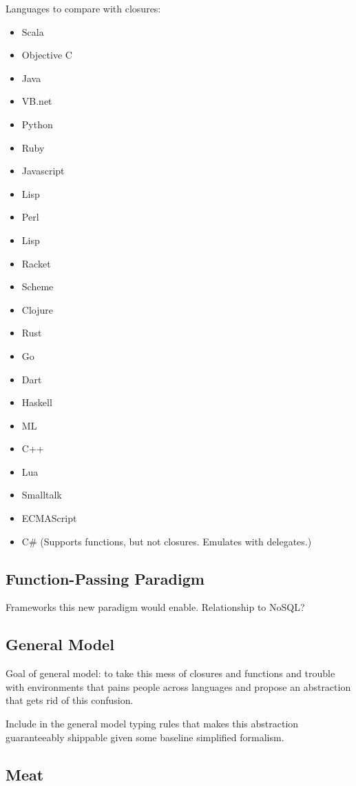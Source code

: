 \documentclass{llncs}
\begin{document}
Languages to compare with closures: 

\begin{itemize}
\item Scala
\item Objective C
\item Java
\item VB.net
\item Python
\item Ruby
\item Javascript
\item Lisp
\item Perl
\item Lisp
\item Racket
\item Scheme
\item Clojure
\item Rust
\item Go
\item Dart
\item Haskell
\item ML
\item C++
\item Lua
\item Smalltalk
\item ECMAScript
\item C\# (Supports functions, but not closures. Emulates with delegates.)
\end{itemize}

\subsection{Function-Passing Paradigm}

Frameworks this new paradigm would enable. Relationship to NoSQL?

\subsection{General Model}

Goal of general model: to take this mess of closures and functions and trouble with environments that pains people across languages and propose an abstraction that gets rid of this confusion.

Include in the general model typing rules that makes this abstraction guaranteeably shippable
given some baseline simplified formalism.

\subsection{Meat}
\end{document}
